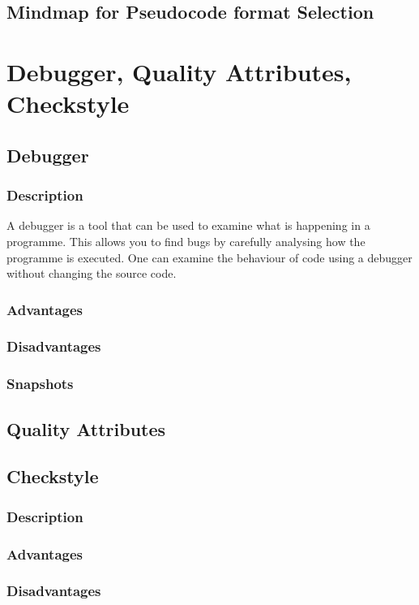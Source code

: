 \documentclass[a4paper,12pt]{report}
\begin{document}
\subsection{Mindmap for Pseudocode format Selection}

\section{Debugger, Quality Attributes, Checkstyle}
\subsection{Debugger}
\subsubsection{Description}A debugger is a tool that can be used to examine what is happening in a programme. This allows you to find bugs by carefully analysing how the programme is executed. One can examine the behaviour of code using a debugger without changing the source code.
\subsubsection{Advantages}
\subsubsection{Disadvantages}
\subsubsection{Snapshots}

\subsection{Quality Attributes}

\subsection{Checkstyle}
\subsubsection{Description}

\subsubsection{Advantages}
\subsubsection{Disadvantages}
\end{document}
